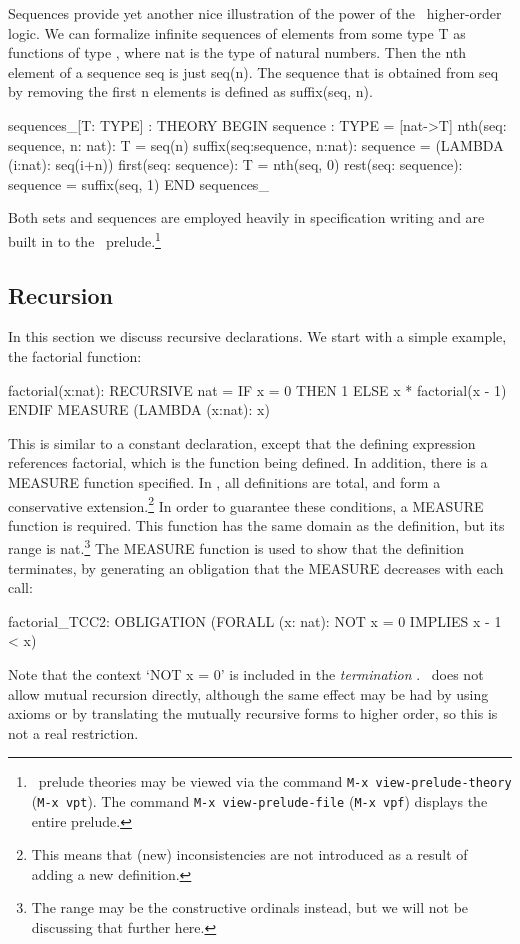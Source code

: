 Sequences provide yet another nice illustration of the power of the
\pvs\ higher-order logic.  We can formalize infinite sequences of
elements from some type {\stt T} as functions of type {\stt [nat ->
T]}, where {\stt nat} is the type of natural numbers.  Then the {\stt
n}th element of a sequence {\stt seq} is just {\stt seq(n)}.  The
sequence that is obtained from {\stt seq} by removing the first {\stt
n} elements is defined as {\stt suffix(seq, n)}.
\begin{pvsexample}
  sequences_[T: TYPE] : THEORY
   BEGIN
    sequence : TYPE = [nat->T]
    nth(seq: sequence, n: nat): T = seq(n)
    suffix(seq:sequence, n:nat): sequence =
      (LAMBDA (i:nat): seq(i+n))
    first(seq: sequence): T = nth(seq, 0)
    rest(seq: sequence): sequence = suffix(seq, 1)
   END sequences_
\end{pvsexample}
%
Both sets and sequences are employed heavily in specification
writing and are built in to the \pvs\ prelude.\footnote{\pvs\ prelude
theories may be viewed via the command {\tt M-x view-prelude-theory}
({\tt M-x vpt}). The command {\tt M-x view-prelude-file} ({\tt M-x vpf})
displays the entire prelude.}

\subsection{Recursion}

In this section we discuss recursive declarations.  We start with a
simple example, the factorial function:
\begin{pvsexample}
  factorial(x:nat): RECURSIVE nat =
    IF x = 0 THEN 1 ELSE x * factorial(x - 1) ENDIF
    MEASURE (LAMBDA (x:nat): x)
\end{pvsexample}
%
This is similar to a constant declaration, except that the defining
expression references {\stt factorial}, which is the function being
defined.  In addition, there is a {\stt MEASURE} function specified.
In \pvs, all definitions are total, and form a conservative
extension.\footnote{This means that (new) inconsistencies are not
introduced as a
result of adding a new definition.} In order to guarantee these
conditions, a {\stt MEASURE} function is required.  This function has the
same domain as the definition, but its range is {\stt nat}.\footnote{The
range may be the constructive ordinals instead, but we will not be
discussing that further here.} The {\stt MEASURE} function is used to
show that the definition terminates, by generating an obligation that
the {\stt MEASURE} decreases with each call:
\begin{pvsexample}
  factorial_TCC2: OBLIGATION
    (FORALL (x: nat): NOT x = 0 IMPLIES x - 1 < x)
\end{pvsexample}
%
Note that the context `{\stt NOT x = 0}' is included in the {\em
termination\/} \tcc.  \pvs\ does not allow mutual recursion directly,
although the same effect may be had by using axioms or by translating
the mutually recursive forms to higher order, so this is not a real
restriction.


